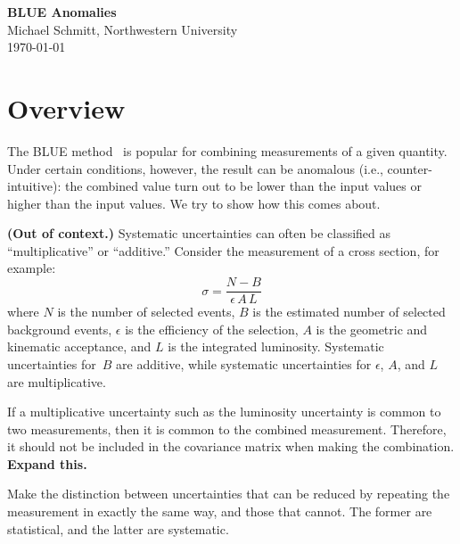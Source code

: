 \documentclass[11pt]{article}
\newcommand{\purple}{\color{purple}}
\begin{document}
\begin{center}
{\large\bf  BLUE Anomalies}  \\
Michael Schmitt, Northwestern University\\
\today
\end{center}




\section{Overview}
\par
The BLUE method~\cite{Lyons} is popular for combining measurements of a given quantity.
Under certain conditions, however, the result can be anomalous (i.e., counter-intuitive):
the combined value turn out to be lower than the input values or higher than
the input values.   We try to show how this comes about.
\par
{\bf (Out of context.)}
Systematic uncertainties can often be classified as ``multiplicative'' or ``additive.''
Consider the measurement of a cross section, for example:
$$
  \sigma = \frac{ N - B }{\epsilon\,A\,L}
$$
where $N$ is the number of selected events, $B$ is the estimated number of 
selected background events, $\epsilon$ is the efficiency of the selection,
$A$ is the geometric and kinematic acceptance, and $L$ is the integrated
luminosity.   Systematic uncertainties for~$B$ are additive, while systematic
uncertainties for $\epsilon$, $A$, and $L$ are multiplicative.
\par
If a multiplicative uncertainty such as the luminosity uncertainty is common to two
measurements, then it is common to the combined measurement.  Therefore, it
should not be included in the covariance matrix when making the combination.
{\bf Expand this.}

\par
{\purple Make the distinction between uncertainties that can be reduced by
repeating the measurement in exactly the same way, and those that cannot.
The former are statistical, and the latter are systematic.}
\end{document}
